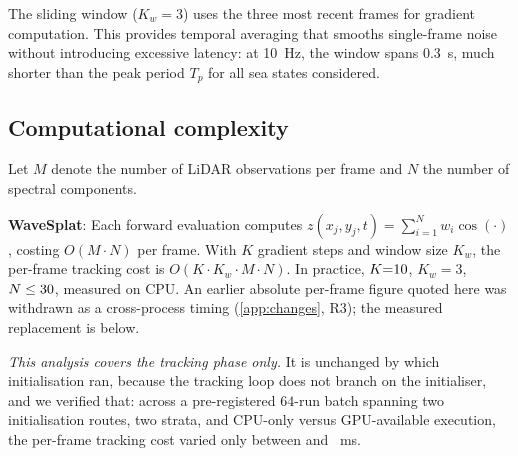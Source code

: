 \documentclass[review]{elsarticle}
\begin{document}
The sliding window ($K_w = 3$) uses the three most recent frames
for gradient computation.  This provides temporal averaging that
smooths single-frame noise without introducing excessive latency:
at 10~Hz, the window spans 0.3~s, much shorter than the peak
period $T_p$ for all sea states considered.

\subsection{Computational complexity}
\label{sec:complexity}

Let $M$ denote the number of LiDAR observations per frame and
$N$ the number of spectral components.

\textbf{WaveSplat}: Each forward evaluation computes
$z(x_j, y_j, t) = \sum_{i=1}^{N} w_i \cos(\cdot)$,
costing $O(M \cdot N)$ per frame. With $K$ gradient steps and window
size $K_w$, the per-frame tracking cost is $O(K \cdot K_w \cdot M \cdot N)$.
In practice, $K{=}10{}$, $K_w{=}3$, $N \leq 30{}$, measured on
CPU. An earlier absolute per-frame figure quoted here was withdrawn as a
cross-process timing (\ref{app:changes}, R3); the measured replacement is
below.

\emph{This analysis covers the tracking phase only.} It is unchanged by which
initialisation ran, because the tracking loop does not branch on the initialiser,
and we verified that: across a pre-registered $64$-run batch spanning two
initialisation routes, two strata, and CPU-only versus GPU-available execution, the
per-frame tracking cost varied only between \FrameMsMin{} and \FrameMsMax{}~ms.
\end{document}
